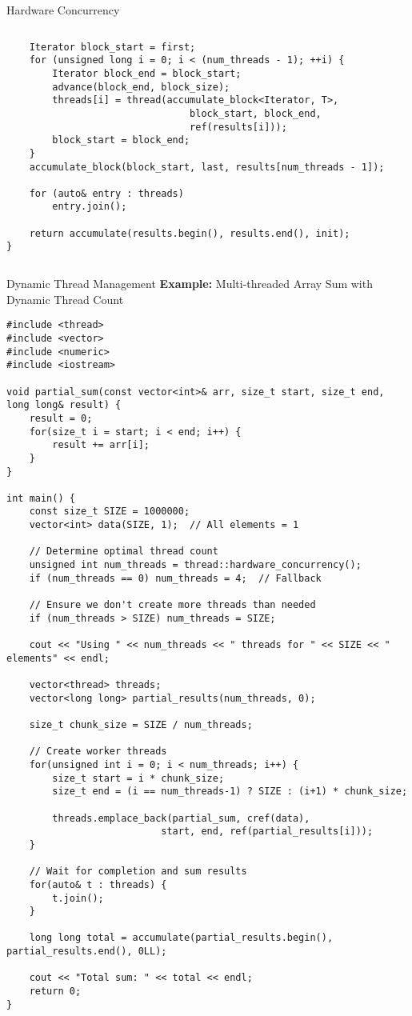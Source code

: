 \begin{frame}[fragile]{Hardware Concurrency}
\begin{columns}
\begin{column}{0.5\textwidth}
\begin{verbatim}
    Iterator block_start = first;
    for (unsigned long i = 0; i < (num_threads - 1); ++i) {
        Iterator block_end = block_start;
        advance(block_end, block_size);
        threads[i] = thread(accumulate_block<Iterator, T>,
                                block_start, block_end,
                                ref(results[i]));
        block_start = block_end;
    }
    accumulate_block(block_start, last, results[num_threads - 1]);

    for (auto& entry : threads)
        entry.join();

    return accumulate(results.begin(), results.end(), init);
}
			\end{verbatim}
		\end{column}
	\end{columns}
\end{frame}

\begin{frame}[fragile]{Dynamic Thread Management}
	\textbf{Example:} Multi-threaded Array Sum with Dynamic Thread Count

	\begin{verbatim}
#include <thread>
#include <vector>
#include <numeric>
#include <iostream>

void partial_sum(const vector<int>& arr, size_t start, size_t end, long long& result) {
    result = 0;
    for(size_t i = start; i < end; i++) {
        result += arr[i];
    }
}

int main() {
    const size_t SIZE = 1000000;
    vector<int> data(SIZE, 1);  // All elements = 1

    // Determine optimal thread count
    unsigned int num_threads = thread::hardware_concurrency();
    if (num_threads == 0) num_threads = 4;  // Fallback

    // Ensure we don't create more threads than needed
    if (num_threads > SIZE) num_threads = SIZE;

    cout << "Using " << num_threads << " threads for " << SIZE << " elements" << endl;

    vector<thread> threads;
    vector<long long> partial_results(num_threads, 0);

    size_t chunk_size = SIZE / num_threads;

    // Create worker threads
    for(unsigned int i = 0; i < num_threads; i++) {
        size_t start = i * chunk_size;
        size_t end = (i == num_threads-1) ? SIZE : (i+1) * chunk_size;

        threads.emplace_back(partial_sum, cref(data),
                           start, end, ref(partial_results[i]));
    }

    // Wait for completion and sum results
    for(auto& t : threads) {
        t.join();
    }

    long long total = accumulate(partial_results.begin(), partial_results.end(), 0LL);

    cout << "Total sum: " << total << endl;
    return 0;
}
	\end{verbatim}
\end{frame}

